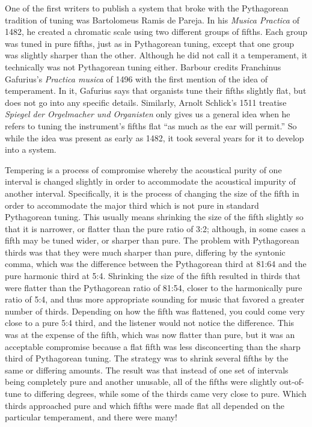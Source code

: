 One of the first writers to publish a system that broke with the Pythagorean tradition of tuning was Bartolomeus Ramis
de Pareja. In his \textit{Musica Practica} of 1482, he created a chromatic scale using two different groups of fifths.
Each group was tuned in pure fifths, just as in Pythagorean tuning, except that one group was slightly sharper than the
other. \autocite[88]{MB:1} Although he did not call it a temperament, it technically was not Pythagorean tuning either.
Barbour credits Franchinus Gafurius's \textit{Practica musica} of 1496 with the first mention of the idea of
temperament. In it, Gafurius says that organists tune their fifths slightly flat, but does not go into any specific
details.\autocite[25]{MB:1} Similarly, Arnolt Schlick's 1511 treatise \textit{Spiegel der Orgelmacher und Organisten}
only gives us a general idea when he refers to tuning the instrument's fifths flat 
``as much as the ear will permit.''\autocite[202]{RR:1} So while the idea was present as early as 1482, it took 
several years for it to develop into a system.

Tempering is a process of compromise whereby the acoustical purity of one interval is changed slightly in order to
accommodate the acoustical impurity of another interval. Specifically, it is the process of changing the size of the
fifth in order to accommodate the major third which is not pure in standard Pythagorean tuning. This usually means
shrinking the size of the fifth slightly so that it is narrower, or flatter than the pure ratio of 3:2; although, in
some cases a fifth may be tuned wider, or sharper than pure. The problem with Pythagorean thirds was that they were much
sharper than pure, differing by the syntonic comma, which was the difference between the Pythagorean third at 81:64 and
the pure harmonic third at 5:4. Shrinking the size of the fifth resulted in thirds that were flatter than the
Pythagorean ratio of 81:54, closer to the harmonically pure ratio of 5:4, and thus more appropriate sounding for music
that favored a greater number of thirds. Depending on how the fifth was flattened, you could come very close to a pure
5:4 third, and the listener would not notice the difference. This was at the expense of the fifth, which was now
flatter than pure, but it was an acceptable compromise because a flat fifth was less disconcerting than the sharp third
of Pythagorean tuning. The strategy was to shrink several fifths by the same or differing amounts. The result was that
instead of one set of intervals being completely pure and another unusable, all of the fifths were slightly out-of-tune
to differing degrees, while some of the thirds came very close to pure. Which thirds approached pure and which fifths
were made flat all depended on the particular temperament, and there were many!

